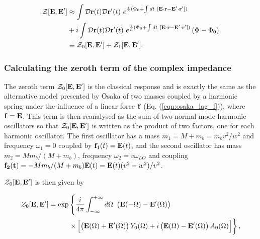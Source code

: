 \begin{equation}
    \begin{aligned}
    \mathcal{Z}[\vb{E}, \vb{E'}] &\approx \int \mathcal{D}\vb{r}(t)\mathcal{D}\vb{r'}(t)\ e^{\frac{i}{\hslash} (\Phi_0 + \int dt\ [\vb{E} \cdot \vb{r} - \vb{E'} \cdot \vb{r'}])} \\
    &+ i\int \mathcal{D}\mathbf{r}(t) \mathcal{D}\mathbf{r'}(t)\ e^{\frac{i}{\hslash} (\Phi_0 + \int dt\ [\vb{E} \cdot \vb{r} - \vb{E'} \cdot \vb{r'}])}\left(\Phi - \Phi_0\right) \\
    &\equiv \mathcal{Z}_0[\vb{E}, \vb{E'}] + \mathcal{Z}_1[\vb{E}, \vb{E'}].
    \end{aligned}
\end{equation}

\subsubsection{Calculating the zeroth term of the complex impedance}

The zeroth term $\mathcal{Z}_0[\vb{E}, \vb{E'}]$ is the classical response and is exactly the same as the alternative model presented by \=Osaka of two masses coupled by a harmonic spring under the influence of a linear force $\vb{f}$ (Eq. (\ref{eqn:osaka_lag_f})), where $\vb{f} = \vb{E}$. This term is then reanalysed as the sum of two normal mode harmonic oscillators so that $\mathcal{Z}_0[\vb{E}, \vb{E'}]$ is written as the product of two factors, one for each harmonic oscillator. The first oscillator has a mass $m_1 = M + m_b = m_b v^2 / w^2$ and frequency $\omega_1 = 0$ coupled by $\vb{f}_1(t) = \vb{E}(t)$, and the second oscillator has mass $m_2 = M m_b / (M + m_b)$, frequency $\omega_2 = v \omega_{LO}$ and coupling $\vb{f_2(t)} = - M m_b / (M + m_b) \vb{E}(t) = \vb{E}(t) (v^2 - w^2) / v^2$. 

$\mathcal{Z}_0[\vb{E}, \vb{E'}]$ is then given by

\begin{equation}\label{eqn:Z0}
    \begin{aligned}
        \mathcal{Z}_0[\vb{E}, \vb{E'}] = \exp &\left\{ \frac{i}{4\pi} \int^{+\infty}_{-\infty}d\Omega\ \left( \vb{E}(-\Omega) - \vb{E'}(\Omega) \right) \right. \\
        &\left. \times \left[ \left( \vb{E}(\Omega) + \vb{E'}(\Omega) \right) Y_0(\Omega)
         + i \left( \vb{E}(\Omega) - \vb{E'}(\Omega) \right) A_0(\Omega) \right]\right\},
    \end{aligned}
\end{equation}

